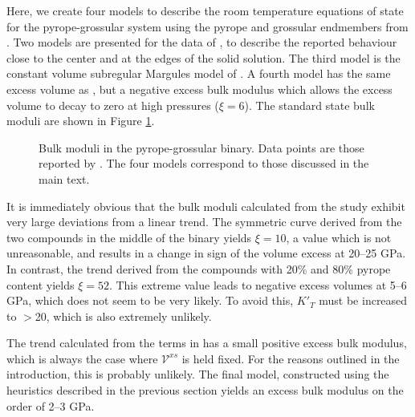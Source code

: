 Here, we create four models to describe the room temperature equations of state for the pyrope-grossular system using the pyrope and grossular endmembers from \cite{HP2011}. Two models are presented for the data of \citep{DCW2015}, to describe the reported behaviour close to the center and at the edges of the solid solution. The third model is the constant volume subregular Margules model of \cite{GCT1996}. A fourth model has the same excess volume as \cite{GCT1996}, but a negative excess bulk modulus which allows the excess volume to decay to zero at high pressures ($\xi=6$). The standard state bulk moduli are shown in Figure \ref{fig:K_T_pyrope_grossular}.


\begin{figure}[ht!]
  \centering
  \caption{Bulk moduli in the pyrope-grossular binary. Data points are those reported by \cite{DCW2015}. The four models correspond to those discussed in the main text.}
  \label{fig:K_T_pyrope_grossular}
\end{figure}

It is immediately obvious that the bulk moduli calculated from the \cite{DCW2015} study exhibit very large deviations from a linear trend. The symmetric curve derived from the two compounds in the middle of the binary yields $\xi=10$, a value which is not unreasonable, and results in a change in sign of the volume excess at 20--25 GPa. In contrast, the trend derived from the compounds with 20\% and 80\% pyrope content yields $\xi=52$. This extreme value leads to negative excess volumes at 5--6 GPa, which does not seem to be very likely. To avoid this, $K'_T$ must be increased to $>$20, which is also extremely unlikely.

The trend calculated from the terms in \cite{GCT1996} has a small positive excess bulk modulus, which is always the case where $\mathcal{V}^{xs}$ is held fixed. For the reasons outlined in the introduction, this is probably unlikely. The final model, constructed using the heuristics described in the previous section yields an excess bulk modulus on the order of 2--3 GPa.

